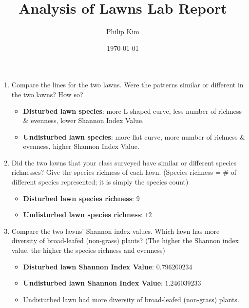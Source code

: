 \documentclass{article}
\title{Analysis of Lawns Lab Report}
\author{Philip Kim}
\date{\today}
\begin{document}
\begin{enumerate}
  \item Compare the lines for the two lawns. Were the patterns similar or different in the two lawns? How so?
  \begin{itemize}
    \item \textbf{Disturbed lawn species}: more L-shaped curve, less number of richness \& evenness, lower Shannon Index Value.
    \item \textbf{Undisturbed lawn species}: more flat curve, more number of richness \& evenness, higher Shannon Index Value.
  \end{itemize}
  \item Did the two lawns that your class surveyed have similar or different species richnesses? Give the species richness of each lawn. (Species richness = \# of different species represented; it is simply the species count)
  \begin{itemize}
    \item \textbf{Disturbed lawn species richness}: \(\boxed{9}\)
    \item \textbf{Undisturbed lawn species richness}: \(\boxed{12}\)
  \end{itemize}
  \item Compare the two lawns’ Shannon index values. Which lawn has more diversity of broad-leafed (non-grass) plants? (The higher the Shannon index value, the higher the species richness and evenness)
  \begin{itemize}
    \item \textbf{Disturbed lawn Shannon Index Value}: \(\boxed{0.796200234}\)
    \item \textbf{Undisturbed lawn Shannon Index Value}: \(\boxed{1.246039233}\)
    \item Undisturbed lawn had more diversity of broad-leafed (non-grass) plants.
  \end{itemize}
\end{enumerate}
\end{document}
